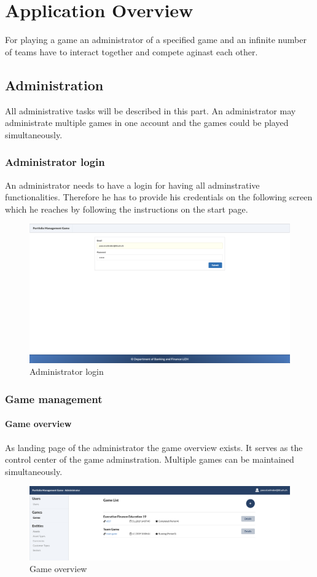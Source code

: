 \section{Application Overview}
For playing a game an administrator of a specified game and an infinite number of teams have to interact together and compete aginast each other.

\subsection{Administration}
All administrative tasks will be described in this part. An administrator may administrate multiple games in one account and the games could be played simultaneously.

\subsubsection{Administrator login}
An administrator needs to have a login for having all adminstrative functionalities. Therefore he has to provide his credentials on the following screen which he reaches by following the instructions on the start page.
\begin{figure}[h!]
  \centering
  \includegraphics[scale=0.2]{img/application-overview/administrator/01_login.png}
  \caption{Administrator login}
\end{figure}

\subsubsection{Game management}
\paragraph{Game overview}
As landing page of the administrator the game overview exists. It serves as the control center of the game adminstration. Multiple games can be maintained simultaneously.
\begin{figure}[h!]
  \centering
  \includegraphics[scale=0.2]{img/application-overview/administrator/02_game_overview.png}
  \caption{Game overview}
\end{figure}

